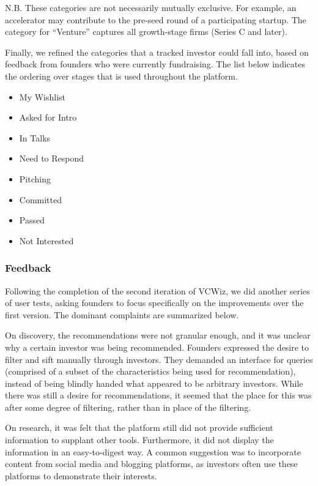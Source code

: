 N.B. These categories are not necessarily mutually exclusive. For example, an accelerator may contribute to the pre-seed round of a participating startup. The category for ``Venture'' captures all growth-stage firms (Series C and later).

Finally, we refined the categories that a tracked investor could fall into, based on feedback from founders who were currently fundraising. The list below indicates the ordering over stages that is used throughout the platform.

\begin{multicols}{2}
\begin{itemize}
  \item My Wishlist
  \item Asked for Intro
  \item In Talks
  \item Need to Respond
  \columnbreak
  \item Pitching
  \item Committed
  \item Passed
  \item Not Interested
\end{itemize}
\end{multicols}

\subsubsection{Feedback}

Following the completion of the second iteration of VCWiz, we did another series of user tests, asking founders to focus specifically on the improvements over the first version. The dominant complaints are summarized below.

On discovery, the recommendations were not granular enough, and it was unclear why a certain investor was being recommended. Founders expressed the desire to filter and sift manually through investors. They demanded an interface for queries (comprised of a subset of the characteristics being used for recommendation), instead of being blindly handed what appeared to be arbitrary investors. While there was still a desire for recommendations, it seemed that the place for this was after some degree of filtering, rather than in place of the filtering.

On research, it was felt that the platform still did not provide sufficient information to supplant other tools. Furthermore, it did not display the information in an easy-to-digest way. A common suggestion was to incorporate content from social media and blogging platforms, as investors often use these platforms to demonstrate their interests.

